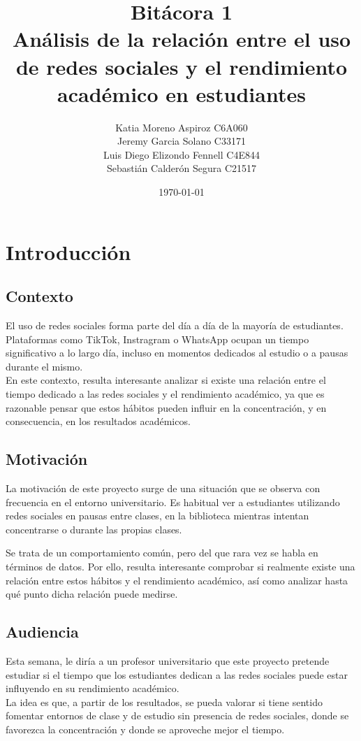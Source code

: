 \documentclass[12pt]{article}
\title{\Huge Bitácora 1\\ \Large Análisis de la relación entre el uso de redes sociales y el rendimiento académico en estudiantes}
\author{Katia Moreno Aspiroz C6A060\\
Jeremy Garcia Solano C33171\\
Luis Diego Elizondo Fennell C4E844\\
Sebastián Calderón Segura C21517}
\date{\today}
\begin{document}
\maketitle
\newpage

\tableofcontents
\newpage

\section{Introducción}
\subsection{Contexto}
El uso de redes sociales forma parte del día a día de la mayoría de estudiantes. Plataformas como TikTok, Instragram o WhatsApp ocupan un tiempo significativo a lo largo día, incluso en momentos dedicados al estudio o a pausas durante el mismo.
\\
En este contexto, resulta interesante analizar si existe una relación entre el tiempo dedicado a las redes sociales y el rendimiento académico, ya que es razonable pensar que estos hábitos pueden influir en la concentración, y en consecuencia, en los resultados académicos.

\subsection{Motivación}
La motivación de este proyecto surge de una situación que se observa con frecuencia en el entorno universitario. Es habitual ver a estudiantes utilizando redes sociales en pausas entre clases, en la biblioteca mientras intentan concentrarse o durante las propias clases. 

Se trata de un comportamiento común, pero del que rara vez se habla en términos de datos. Por ello, resulta interesante comprobar si realmente existe una relación entre estos hábitos y el rendimiento académico, así como analizar hasta qué punto dicha relación puede medirse.

\subsection{Audiencia}
Esta semana, le diría a un profesor universitario que este proyecto pretende estudiar si el tiempo que los estudiantes dedican a las redes sociales puede estar influyendo en su rendimiento académico.
\\
La idea es que, a partir de los resultados, se pueda valorar si tiene sentido fomentar entornos de clase y de estudio sin presencia de redes sociales, donde se favorezca la concentración y donde se aproveche mejor el tiempo.
\end{document}

